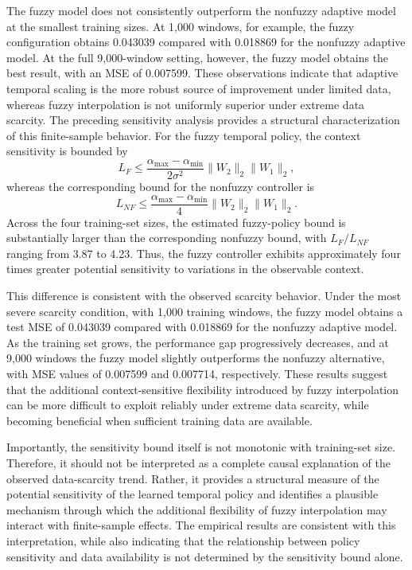 \documentclass[journal]{IEEEtran}
\begin{document}
	The fuzzy model does not consistently outperform the nonfuzzy adaptive model at the smallest training sizes. At 1,000 windows, for example, the fuzzy configuration obtains 0.043039 compared with 0.018869 for the nonfuzzy adaptive model. At the full 9,000-window setting, however, the fuzzy model obtains the best result, with an MSE of 0.007599. These observations indicate that adaptive temporal scaling is the more robust source of improvement under limited data, whereas fuzzy interpolation is not uniformly superior under extreme data scarcity. The preceding sensitivity analysis provides a structural characterization of this finite-sample behavior. For the fuzzy temporal policy, the context sensitivity is bounded by
	\[
	L_F
	\leq
	\frac{\alpha_{\max}-\alpha_{\min}}
	{2\sigma^2}
	\|W_2\|_2\|W_1\|_2,
	\]
	whereas the corresponding bound for the nonfuzzy controller is
	\[
	L_{NF}
	\leq
	\frac{\alpha_{\max}-\alpha_{\min}}
	{4}
	\|W_2\|_2\|W_1\|_2.
	\]
	Across the four training-set sizes, the estimated fuzzy-policy bound is substantially larger than the corresponding nonfuzzy bound, with $L_F/L_{NF}$ ranging from 3.87 to 4.23. Thus, the fuzzy controller
	exhibits approximately four times greater potential sensitivity to variations in the observable context.
	
	This difference is consistent with the observed scarcity behavior. Under the most severe scarcity condition, with 1,000 training windows, the fuzzy model obtains a test MSE of 0.043039 compared with 0.018869 for the nonfuzzy adaptive model. As the training set grows, the performance gap progressively decreases, and at 9,000 windows the fuzzy model slightly outperforms the nonfuzzy alternative, with MSE values of 0.007599 and 0.007714, respectively. These results suggest that the additional context-sensitive flexibility introduced by fuzzy interpolation can be more difficult to exploit reliably under extreme data scarcity, while becoming beneficial when sufficient training data are available.
	
	Importantly, the sensitivity bound itself is not monotonic with training-set size. Therefore, it should not be interpreted as a complete causal explanation of the observed data-scarcity trend. Rather, it provides a structural measure of the potential sensitivity of the learned temporal policy and identifies a plausible mechanism through which the additional flexibility of fuzzy interpolation may interact with finite-sample effects. The empirical results are consistent with this interpretation, while also indicating that the relationship between policy sensitivity and data availability is not determined by the sensitivity bound alone.
	
\end{document}
